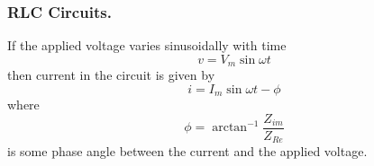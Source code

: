\documentclass[../../../main.tex]{subfiles}
\begin{document}
\subsubsection*{RLC Circuits.} If the applied voltage varies sinusoidally with time
\begin{equation*}
    v=V_m\sin \omega t
\end{equation*}
then current in the circuit is given by
\begin{equation*}
    i=I_m\sin\omega t-\phi
\end{equation*}
where
\begin{equation*}
    \phi=\arctan^{-1}\frac{Z_{im}}{Z_{Re}}
\end{equation*}
is some phase angle between the current and the applied voltage.
\end{document}
